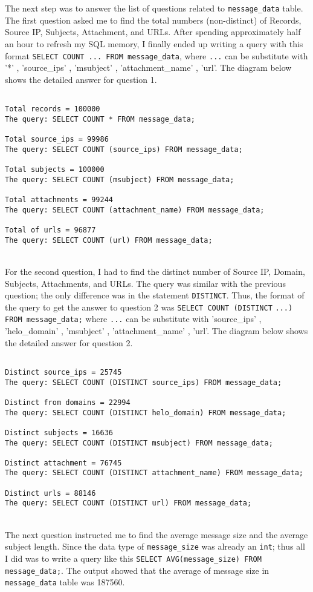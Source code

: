 \documentclass[letterpaper,10pt,titlepage,draftclsnofoot,onecolumn]{IEEEtran}
\begin{document}
\hfill\\\hfill\\
The next step was to answer the list of questions related to \verb|message_data| table.
The first question asked me to find the total numbers (non-distinct) of Records, Source IP, Subjects, Attachment, and URLs. 
After spending approximately half an hour to refresh my SQL memory, I finally ended up writing a query with this format \verb|SELECT COUNT ... FROM message_data|, where \verb|...| can be substitute with '*' , 'source\_ips' , 'msubject' , 'attachment\_name' , 'url'.
The diagram below shows the detailed answer for question 1.
\begin{lstlisting}

Total records = 100000 
The query: SELECT COUNT * FROM message_data;

Total source_ips = 99986 
The query: SELECT COUNT (source_ips) FROM message_data;

Total subjects = 100000 
The query: SELECT COUNT (msubject) FROM message_data;

Total attachments = 99244 
The query: SELECT COUNT (attachment_name) FROM message_data;

Total of urls = 96877 
The query: SELECT COUNT (url) FROM message_data;

\end{lstlisting}
\hfill\\
For the second question, I had to find the distinct number of Source IP, Domain, Subjects, Attachments, and URLs.
The query was similar with the previous question; the only difference was in the statement \verb|DISTINCT|.
Thus, the format of the query to get the answer to question 2 was \verb|SELECT COUNT (DISTINCT| \verb|...) FROM message_data;| where \verb|...| can be substitute with 'source\_ips' , 'helo\_domain' , 'msubject' , 'attachment\_name' , 'url'. 
The diagram below shows the detailed answer for question 2.

\begin{lstlisting}

Distinct source_ips = 25745 
The query: SELECT COUNT (DISTINCT source_ips) FROM message_data;

Distinct from domains = 22994 
The query: SELECT COUNT (DISTINCT helo_domain) FROM message_data;

Distinct subjects = 16636 
The query: SELECT COUNT (DISTINCT msubject) FROM message_data;

Distinct attachment = 76745 
The query: SELECT COUNT (DISTINCT attachment_name) FROM message_data;

Distinct urls = 88146 
The query: SELECT COUNT (DISTINCT url) FROM message_data;

\end{lstlisting}
\hfill\\
The next question instructed me to find the average message size and the average subject length.
Since the data type of \verb|message_size| was already an \verb|int|; thus all I did was to write a query like this \verb|SELECT AVG(message_size) FROM message_data;|. 
The output showed that the average of message size in \verb|message_data| table was 187560.
\end{document}
